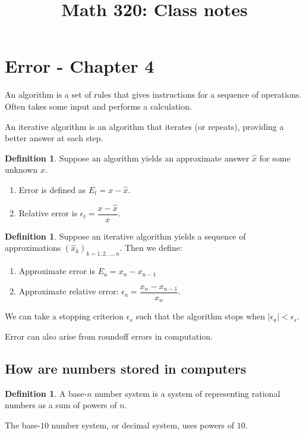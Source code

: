 \documentclass[12pt]{amsart}
\theoremstyle{definition}
\newtheorem{defn}[thm]{Definition}   %
\begin{document}
\title{Math 320: Class notes}
\maketitle


\section{Error - Chapter 4}

An algorithm is a set of rules that gives instructions for
a sequence of operations. Often takes some input and performs
a calculation.

An iterative algorithm is an algorithm that iterates (or repeats),
providing a better answer at each step.

\begin{defn}
Suppose an algorithm yields an approximate answer $\hat{x}$ for some
unknown $x$. \begin{enumerate} 
\item Error is defined as $E_t = x - \hat{x}$.
\item Relative error is $\epsilon_t = \dfrac{x - \hat{x}}{x}$.
\end{enumerate}

\end{defn}

\begin{defn}
Suppose an iterative algorithm yields a sequence of approximations 
$(\hat{x}_{k})_{k = 1,2,\ldots,n}$. Then we define: \begin{enumerate}
\item Approximate error is $E_a = x_n - x_{n-1}$ 
\item Approximate relative error: $\epsilon_a = \dfrac{x_n - x_{n-1}}{x_n}$.
\end{enumerate}
We can take a stopping criterion $\epsilon_s$ such that 
the algorithm stops when $|\epsilon_a| < \epsilon_s$.
\end{defn}

Error can also arise from roundoff errors in computation.

\subsection{How are numbers stored in computers}

\begin{defn}
A base-$n$ number system is a system of representing
rational numbers as a sum of powers of $n$.

The base-$10$ number system, or decimal system, uses
powers of $10$.
\end{defn}
\end{document}
